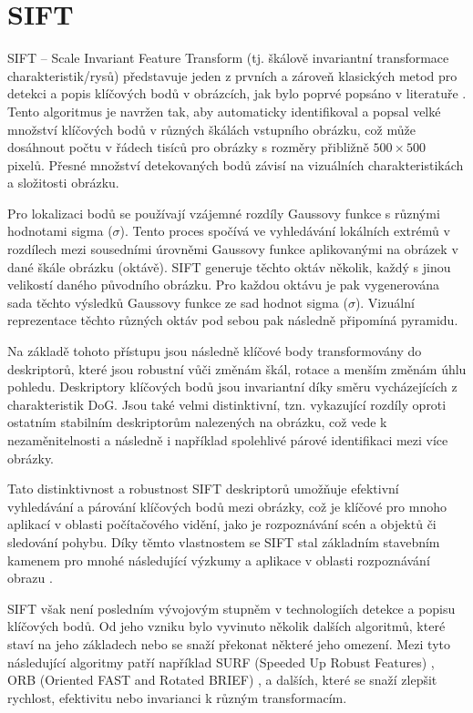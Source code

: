 \section{SIFT}
\label{sec:Chapter21}
SIFT -- Scale Invariant Feature Transform (tj. škálově invariantní transformace charakteristik/rysů) představuje jeden z prvních a zároveň klasických metod pro detekci a popis klíčových bodů v obrázcích, jak bylo poprvé popsáno v literatuře \cite{sift}. Tento algoritmus je navržen tak, aby automaticky identifikoval a popsal velké množství klíčových bodů v různých škálách vstupního obrázku, což může dosáhnout počtu v řádech tisíců pro obrázky s rozměry přibližně $500\times500$ pixelů. Přesné množství detekovaných bodů závisí na vizuálních charakteristikách a složitosti obrázku.

Pro lokalizaci bodů se používají vzájemné rozdíly Gaussovy funkce s různými hodnotami sigma ($\sigma$). Tento proces spočívá ve vyhledávání lokálních extrémů v rozdílech mezi sousedními úrovněmi Gaussovy funkce aplikovanými na obrázek v dané škále obrázku (oktávě). SIFT generuje těchto oktáv několik, každý s jinou velikostí daného původního obrázku. Pro každou oktávu je pak vygenerována sada těchto výsledků Gaussovy funkce ze sad hodnot sigma ($\sigma$). Vizuální reprezentace těchto různých oktáv pod sebou pak následně připomíná pyramidu.

Na základě tohoto přístupu jsou následně klíčové body transformovány do deskriptorů, které jsou robustní vůči změnám škál, rotace a menším změnám úhlu pohledu. Deskriptory klíčových bodů jsou invariantní díky směru vycházejících z charakteristik DoG. Jsou také velmi distinktivní, tzn. vykazující rozdíly oproti ostatním stabilním deskriptorům nalezených na obrázku, což vede k nezaměnitelnosti a následně i například spolehlivé párové identifikaci mezi více obrázky.


Tato distinktivnost a robustnost SIFT deskriptorů umožňuje efektivní vyhledávání a párování klíčových bodů mezi obrázky, což je klíčové pro mnoho aplikací v oblasti počítačového vidění, jako je rozpoznávání scén a objektů či sledování pohybu. Díky těmto vlastnostem se SIFT stal základním stavebním kamenem pro mnohé následující výzkumy a aplikace v oblasti rozpoznávání obrazu \cite{sift}.

SIFT však není posledním vývojovým stupněm v technologiích detekce a popisu klíčových bodů. Od jeho vzniku bylo vyvinuto několik dalších algoritmů, které staví na jeho základech nebo se snaží překonat některé jeho omezení. Mezi tyto následující algoritmy patří například SURF (Speeded Up Robust Features) \cite{surf}, ORB (Oriented FAST and Rotated BRIEF) \cite{orb}, a dalších, které se snaží zlepšit rychlost, efektivitu nebo invarianci k různým transformacím.
\endinput